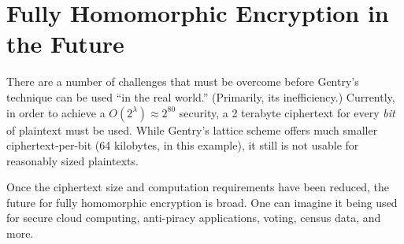 \documentclass[a4paper,10pt]{article}
\begin{document}
\section{Fully Homomorphic Encryption in the Future}
There are a number of challenges that must be overcome before Gentry's
technique can be used ``in the real world.'' (Primarily, its
inefficiency.) Currently, in order to achieve a $O(2^\lambda) \approx 2^{80}$ 
security, a 2 terabyte ciphertext for every \textit{bit} of plaintext
must be used. While Gentry's lattice scheme\cite{gentry-lattice}
offers much smaller ciphertext-per-bit (64 kilobytes, in this
example), it still is not usable for reasonably sized plaintexts.

Once the ciphertext size and computation requirements have been reduced,
the future for fully homomorphic encryption is broad. One can imagine it
being used for secure cloud computing, anti-piracy applications, voting,
census data, and more.

\pagebreak

\end{document}
